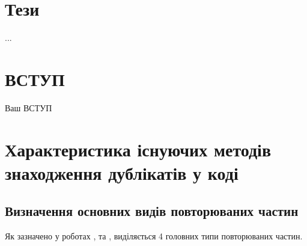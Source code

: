 \documentclass[a4paper, 14pt]{article}
\begin{document}
\section*{Т\lowercase{ези}}
...
\newpage
\tableofcontents %
\newpage
\section*{\textbf{ВСТУП}}
Ваш ВСТУП
\newpage %
\section{Характеристика існуючих методів знаходження дублікатів у коді}
\subsection{Визначення основних видів повторюваних частин}
Як зазначено у роботах \cite{Gautam16}, \cite{Dang15} та \cite{Thummalapenta10}, виділяється 4 головних типи повторюваних частин. 
\end{document}

